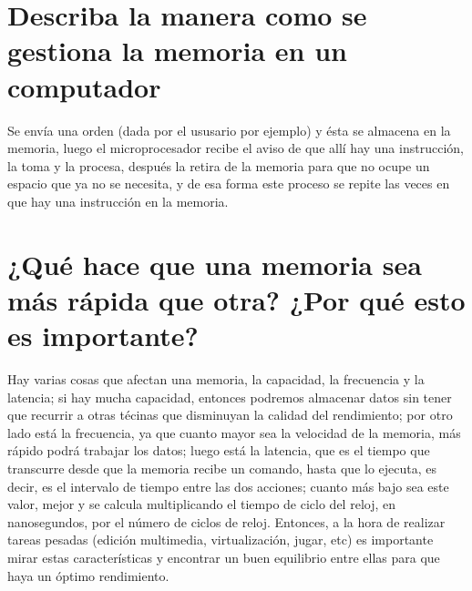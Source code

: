 \documentclass{article}
\begin{document}
\section{Describa la manera como se gestiona la memoria en un computador}
Se envía una orden (dada por el ususario por ejemplo) y ésta se almacena en la memoria, luego el microprocesador recibe el aviso de que allí hay una instrucción, la toma y la procesa, después la retira de la memoria para que no ocupe un espacio que ya no se necesita, y de esa forma este proceso se repite las veces en que hay una instrucción en la memoria.
\cite{memoria}
\section{¿Qué hace que una memoria sea más rápida que otra? ¿Por qué esto es importante?}
Hay varias cosas que afectan una memoria, la capacidad, la frecuencia y la latencia; si hay mucha capacidad, entonces podremos almacenar datos sin tener que recurrir a otras técinas que disminuyan la calidad del rendimiento; por otro lado está la frecuencia, ya que cuanto mayor sea la velocidad de la memoria, más rápido podrá trabajar los datos; luego está la latencia, que es el tiempo que transcurre desde que la memoria recibe un comando, hasta que lo ejecuta, es decir, es el intervalo de tiempo entre las dos acciones; cuanto más bajo sea este valor, mejor y se calcula multiplicando el tiempo de ciclo del reloj, en nanosegundos, por el número de ciclos de reloj. Entonces, a la hora de realizar tareas pesadas (edición multimedia, virtualización, jugar, etc) es importante mirar estas características y encontrar un buen equilibrio entre ellas para que haya un óptimo rendimiento.
\cite{rendimiento}



\end{document}
